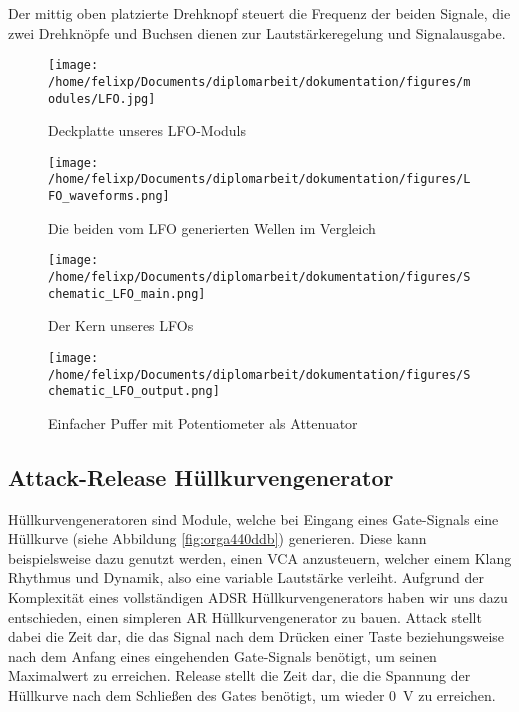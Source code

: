 Der mittig oben platzierte Drehknopf steuert die Frequenz der beiden Signale, die zwei Drehknöpfe und Buchsen dienen zur Lautstärkeregelung und Signalausgabe.

\begin{figure}[hp]
\centering
\texttt{[image: /home/felixp/Documents/diplomarbeit/dokumentation/figures/modules/LFO.jpg]}
\caption{Deckplatte unseres LFO-Moduls}
\end{figure}

\begin{figure}[hp]
\centering
\texttt{[image: /home/felixp/Documents/diplomarbeit/dokumentation/figures/LFO\_waveforms.png]}
\caption{\label{fig:orge67972e}Die beiden vom LFO generierten Wellen im Vergleich}
\end{figure}

\begin{figure}[hp]
\centering
\texttt{[image: /home/felixp/Documents/diplomarbeit/dokumentation/figures/Schematic\_LFO\_main.png]}
\caption{\label{fig:org31668b3}Der Kern unseres LFOs}
\end{figure}

\begin{figure}[hp]
\centering
\texttt{[image: /home/felixp/Documents/diplomarbeit/dokumentation/figures/Schematic\_LFO\_output.png]}
\caption{\label{fig:org7b85d29}Einfacher Puffer mit Potentiometer als Attenuator}
\end{figure}

\newpage
\subsection{Attack-Release Hüllkurvengenerator \label{AR}}
\label{sec:org3ed2bf3}
Hüllkurvengeneratoren sind Module, welche bei Eingang eines Gate-Signals eine Hüllkurve (siehe Abbildung \ref{fig:orga440ddb}) generieren. Diese kann beispielsweise dazu genutzt werden, einen \ac{VCA} anzusteuern, welcher einem Klang Rhythmus und Dynamik, also eine variable Lautstärke verleiht. Aufgrund der Komplexität eines vollständigen \ac{ADSR} Hüllkurvengenerators haben wir uns dazu entschieden, einen simpleren \ac{AR} Hüllkurvengenerator zu bauen. Attack stellt dabei die Zeit dar, die das Signal nach dem Drücken einer Taste beziehungsweise nach dem Anfang eines eingehenden Gate-Signals benötigt, um seinen Maximalwert zu erreichen. Release stellt die Zeit dar, die die Spannung der Hüllkurve nach dem Schließen des Gates benötigt, um wieder \SI{0}{\volt} zu erreichen.

